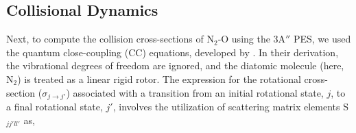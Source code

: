 \documentclass[fleqn,usenatbib]{mnras}
\begin{document}

\subsection{Collisional Dynamics}
Next, to compute the collision cross-sections of N$_2$-O using the 3A$''$ PES, we used the quantum close-coupling (CC) equations, developed by \cite{doi:10.1098/rspa.1960.0125}. In their derivation, the  vibrational degrees of freedom are ignored, and  the  diatomic  molecule (here, N$_2$) is  treated as  a linear rigid  rotor. The expression for the rotational cross-section ($\sigma_{j\rightarrow j'}$) associated with a transition from an initial rotational state, $j$, to a final rotational state, $j'$, involves the utilization of scattering matrix elements S$_{jj'll'}$ as,
\end{document}
